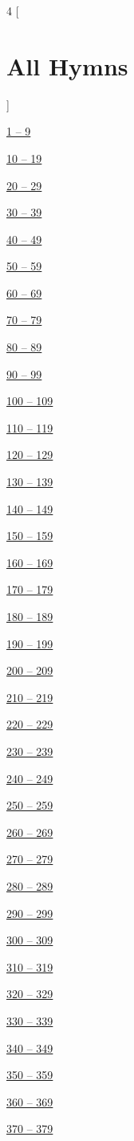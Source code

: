 
\setlength{\parindent}{0pt}
\setlength{\parskip}{0.5in}

\centering
\LARGE
\hypertarget{topindex}{}
\begin{multicols}{4}
[
\section*{All Hymns}
]

\hyperlink{EOG00x}{1 -- 9}

\hyperlink{EOG01x}{10 -- 19}

\hyperlink{EOG020}{20 -- 29}

\hyperlink{EOG030}{30 -- 39}

\hyperlink{EOG040}{40 -- 49}

\hyperlink{EOG050}{50 -- 59}

\hyperlink{EOG060}{60 -- 69}

\hyperlink{EOG070}{70 -- 79}

\hyperlink{EOG080}{80 -- 89}

\hyperlink{EOG090}{90 -- 99}

\hyperlink{EOG100}{100 -- 109}

\hyperlink{EOG110}{110 -- 119}

\hyperlink{EOG120}{120 -- 129}

\hyperlink{EOG130}{130 -- 139}

\hyperlink{EOG140}{140 -- 149}

\hyperlink{EOG150}{150 -- 159}

\hyperlink{EOG160}{160 -- 169}

\hyperlink{EOG170}{170 -- 179}

\hyperlink{EOG180}{180 -- 189}

\hyperlink{EOG190}{190 -- 199}

\hyperlink{EOG200}{200 -- 209}

\hyperlink{EOG210}{210 -- 219}

\hyperlink{EOG220}{220 -- 229}

\hyperlink{EOG230}{230 -- 239}

\hyperlink{EOG240}{240 -- 249}

\hyperlink{EOG250}{250 -- 259}

\hyperlink{EOG260}{260 -- 269}

\hyperlink{EOG270}{270 -- 279}

\hyperlink{EOG280}{280 -- 289}

\hyperlink{EOG290}{290 -- 299}

\hyperlink{EOG300}{300 -- 309}

\hyperlink{EOG310}{310 -- 319}

\hyperlink{EOG320}{320 -- 329}

\hyperlink{EOG330}{330 -- 339}

\hyperlink{EOG340}{340 -- 349}

\hyperlink{EOG350}{350 -- 359}

\hyperlink{EOG360}{360 -- 369}

\hyperlink{EOG370}{370 -- 379}

\end{multicols}

